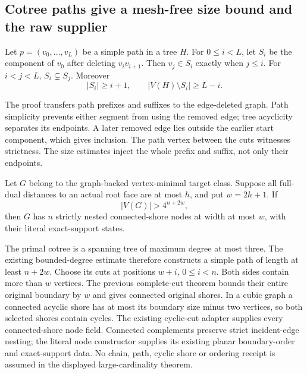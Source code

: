 \subsection{Cotree paths give a mesh-free size bound and the raw supplier}
\label{sec:cotree-path-size}

\begin{lemma}
Let $p=(v_0,\ldots,v_L)$ be a simple path in a tree $H$.
For $0\le i<L$, let $S_i$ be the component of $v_0$ after deleting
$v_iv_{i+1}$.  Then $v_j\in S_i$ exactly when $j\le i$.
For $i<j<L$, $S_i\subsetneq S_j$.  Moreover
\[
                    |S_i|\ge i+1,
        \qquad |V(H)\setminus S_i|\ge L-i.
\]
\end{lemma}

The proof transfers path prefixes and suffixes to the edge-deleted graph.
Path simplicity prevents either segment from using the removed edge;
tree acyclicity separates its endpoints.  A later removed edge lies
outside the earlier start component, which gives inclusion.  The path
vertex between the cuts witnesses strictness.  The size estimates inject
the whole prefix and suffix, not only their endpoints.

\begin{theorem}
Let $G$ belong to the graph-backed vertex-minimal target class.  Suppose
all full-dual distances to an actual root face are at most $h$, and put
$w=2h+1$.  If
\[
                         |V(G)|>4^{n+2w},
\]
then $G$ has $n$ strictly nested connected-shore nodes at width at most
$w$, with their literal exact-support states.
\end{theorem}

The primal cotree is a spanning tree of maximum degree at most three.
The existing bounded-degree estimate therefore constructs a simple path
of length at least $n+2w$.  Choose its cuts at positions $w+i$,
$0\le i<n$.  Both sides contain more than $w$ vertices.  The previous
complete-cut theorem bounds their entire original boundary by $w$ and
gives connected original shores.
In a cubic graph a connected acyclic shore has at most its boundary size
minus two vertices, so both selected shores contain cycles.
The existing cyclic-cut adapter supplies every connected-shore node
field.  Connected complements preserve strict incident-edge nesting;
the literal node constructor supplies its existing planar boundary-order
and exact-support data.  No chain, path, cyclic shore or ordering receipt
is assumed in the displayed large-cardinality theorem.

